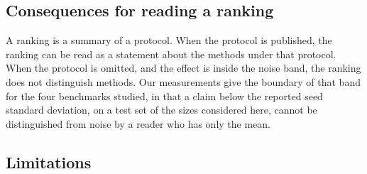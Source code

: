 \documentclass{interact}
\begin{document}
\subsection{Consequences for reading a ranking}\label{sec:reading}

A ranking is a summary of a protocol. When the protocol is published, the ranking can be read as a statement about the methods under that protocol. When the protocol is omitted, and the effect is inside the noise band, the ranking does not distinguish methods. Our measurements give the boundary of that band for the four benchmarks studied, in that a claim below the reported seed standard deviation, on a test set of the sizes considered here, cannot be distinguished from noise by a reader who has only the mean.

\subsection{Limitations}\label{sec:limitations}
\end{document}
